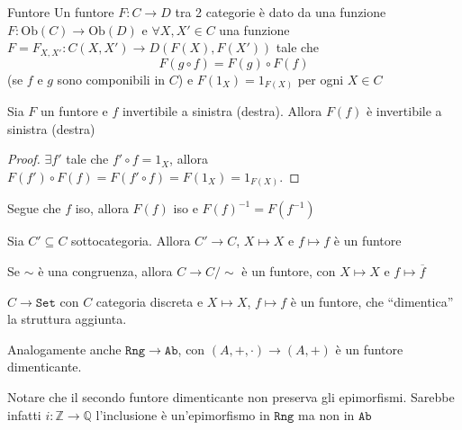 \begin{definition}{Funtore}
    Un funtore \(F : C \to D\) tra 2 categorie è dato da una funzione
    \(F : \mathrm{Ob}{(C)} \to \mathrm{Ob}{(D)}\) e \(\forall X, X' \in C\) una
    funzione \(F = F_{X, X'} : C{(X, X')} \to D{(F{(X)}, F{(X')})}\) tale che
    \[
      F{(g\circ f)} = F{(g)}\circ F{(f)} 
    \]
    (se \(f\) e \(g\) sono componibili in \(C\)) e \(F{(1_X)} = 1_{F{(X)}} \)
    per ogni \(X \in C\) 
    
\end{definition}
\begin{proposition}{}
    Sia \(F\) un funtore e \(f\) invertibile a sinistra (destra). Allora \(F{(f)}\) è invertibile a sinistra (destra)
\end{proposition}
\begin{proof}{}
    \(\exists f'\) tale che \(f' \circ f = 1_X\), allora \(F{(f')} \circ F{(f)} = F{(f'\circ f)} = F{(1_X)} = 1_{F{(X)}} \).
\end{proof}
\begin{remark}{}
    Segue che \(f\) iso, allora \(F{(f)}\) iso e \(F{(f)}^{-1} = F{(f^{-1})}\) 
\end{remark}

\begin{example}{}
    Sia \(C' \subseteq C \) sottocategoria. Allora \(C' \to C\), \(X \mapsto X\) e \(f \mapsto f\) è un funtore
\end{example}

\begin{example}{}
    Se \(\sim \) è una congruenza, allora \(C \to C /\sim\) è un funtore, con
    \(X \mapsto X\) e \(f \mapsto \overline{f}\) 
\end{example}

\begin{example}
    \(C \to \mathtt{Set}\) con \(C\) categoria discreta e \(X \mapsto X\), \(f
    \mapsto f\) è un funtore, che ``dimentica'' la struttura aggiunta.

    Analogamente anche \(\mathtt{Rng} \to \mathtt{Ab}\), con \({(A, +, \cdot )} \to {(A, +)}\) è un funtore dimenticante.
\end{example}
\begin{remark}{}
    Notare che il secondo funtore dimenticante non preserva gli epimorfismi.
    Sarebbe infatti \(i : \mathbb{Z} \to \mathbb{Q}\) l'inclusione è
    un'epimorfismo in \(\mathtt{Rng}\) ma non in \(\mathtt{Ab}\) 
\end{remark}


